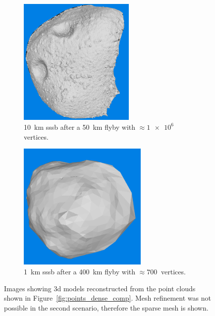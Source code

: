 \begin{figure}[htb]
    \centering
        \begin{subfigure}[b]{0.42\textwidth}
            \centering
            \includegraphics[width=\textwidth,height=6.2cm]{doc/thesis/0_figures/models_quality/50_10/120_50_10_refine2.png}
            \caption{\SI{10}{\kilo\meter} \gls{sssb} after a \SI{50}{\kilo\meter} flyby with $\approx\SI{1e6}{}$ vertices.} %
            \label{fig:models_50_10}
        \end{subfigure}
        \begin{subfigure}[b]{0.42\textwidth}
            \centering
            \includegraphics[width=\textwidth,height=6.2cm]{doc/thesis/0_figures/models_quality/400_1/120_400_1_mesh2.png}
            \caption{\SI{1}{\kilo\meter} \gls{sssb} after a \SI{400}{\kilo\meter} flyby with $\approx\SI{700}{}$ vertices.}
            \label{fig:models_400_1}
        \end{subfigure}
    \caption{Images showing \gls{3d} models reconstructed from the point clouds shown in Figure~\ref{fig:points_dense_comp}. Mesh refinement was not possible in the second scenario, therefore the sparse mesh is shown.}
    \label{fig:models_comp}
\end{figure}


